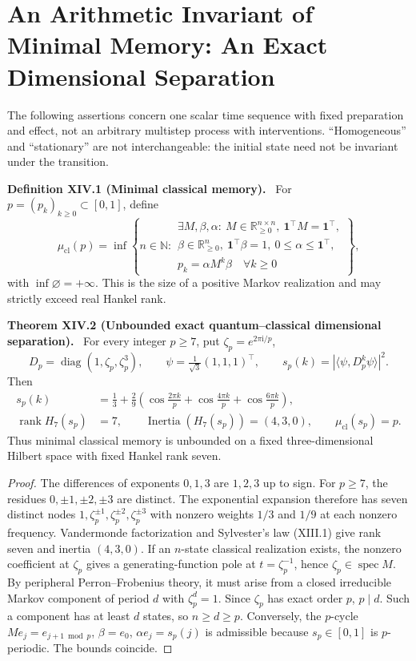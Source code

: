 \documentclass[11pt,a4paper,oneside]{book}
\newcommand{\R}{\mathbb R}\newcommand{\C}{\mathbb C}\newcommand{\Z}{\mathbb Z}\newcommand{\N}{\mathbb N}\newcommand{\Q}{\mathbb Q}
\newcommand{\one}{\mathbf 1}\newcommand{\ii}{\mathrm i}\newcommand{\dd}{\mathrm d}
\DeclareMathOperator{\rank}{rank}\DeclareMathOperator{\Tr}{Tr}
\DeclareMathOperator{\spec}{spec}\DeclareMathOperator{\diag}{diag}
\newcommand{\statement}[3]{\par\medskip\noindent\textbf{#1 #2 (#3).}\ }
\begin{document}
\chapter{An Arithmetic Invariant of Minimal Memory: An Exact Dimensional Separation}
The following assertions concern one scalar time sequence with fixed preparation and effect, not an arbitrary multistep process with interventions. ``Homogeneous'' and ``stationary'' are not interchangeable: the initial state need not be invariant under the transition.
\statement{Definition}{XIV.1}{Minimal classical memory} For $p=(p_k)_{k\ge0}\subset[0,1]$, define
\[\mu_{\mathrm{cl}}(p)=\inf\left\{n\in\N:\begin{array}{l}\exists M,\beta,\alpha:\ M\in\R_{\ge0}^{n\times n},\ \one^\top M=\one^\top,\\\beta\in\R_{\ge0}^n,\ \one^\top\beta=1,\ 0\le\alpha\le\one^\top,\\p_k=\alpha M^k\beta\quad\forall k\ge0\end{array}\right\},\]
with $\inf\varnothing=+\infty$. This is the size of a positive Markov realization and may strictly exceed real Hankel rank.
\statement{Theorem}{XIV.2}{Unbounded exact quantum--classical dimensional separation} For every integer $p\ge7$, put $\zeta_p=e^{2\pi\ii/p}$,
\[D_p=\diag(1,\zeta_p,\zeta_p^3),\qquad\psi=\tfrac1{\sqrt3}(1,1,1)^\top,\qquad s_p(k)=|\langle\psi,D_p^k\psi\rangle|^2.\]
Then
\begin{align}s_p(k)&=\tfrac13+\tfrac29\left(\cos\frac{2\pi k}p+\cos\frac{4\pi k}p+\cos\frac{6\pi k}p\right),\tag{66}\\
\rank H_7(s_p)&=7,\qquad\operatorname{Inertia}(H_7(s_p))=(4,3,0),\qquad\mu_{\mathrm{cl}}(s_p)=p.\tag{67}\end{align}
Thus minimal classical memory is unbounded on a fixed three-dimensional Hilbert space with fixed Hankel rank seven.
\begin{proof}The differences of exponents $0,1,3$ are $1,2,3$ up to sign. For $p\ge7$, the residues $0,\pm1,\pm2,\pm3$ are distinct. The exponential expansion therefore has seven distinct nodes $1,\zeta_p^{\pm1},\zeta_p^{\pm2},\zeta_p^{\pm3}$ with nonzero weights $1/3$ and $1/9$ at each nonzero frequency. Vandermonde factorization and Sylvester's law (XIII.1) give rank seven and inertia $(4,3,0)$. If an $n$-state classical realization exists, the nonzero coefficient at $\zeta_p$ gives a generating-function pole at $t=\zeta_p^{-1}$, hence $\zeta_p\in\spec M$. By peripheral Perron--Frobenius theory, it must arise from a closed irreducible Markov component of period $d$ with $\zeta_p^d=1$. Since $\zeta_p$ has exact order $p$, $p\mid d$. Such a component has at least $d$ states, so $n\ge d\ge p$. Conversely, the $p$-cycle $Me_j=e_{j+1\bmod p}$, $\beta=e_0$, $\alpha e_j=s_p(j)$ is admissible because $s_p\in[0,1]$ is $p$-periodic. The bounds coincide.\end{proof}
\end{document}
